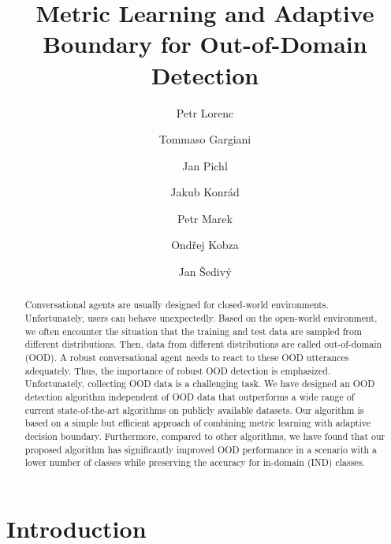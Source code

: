 \documentclass[runningheads]{llncs}
\begin{document}
\title{Metric Learning and Adaptive Boundary for Out-of-Domain Detection}
\author{Petr Lorenc \and
Tommaso Gargiani \and
Jan Pichl \and
Jakub Konrád \and
Petr Marek \and
Ondřej Kobza \and
Jan Šedivý
}
\maketitle              \begin{abstract}
Conversational agents are usually designed for closed-world environments. Unfortunately, users can behave unexpectedly. Based on the open-world environment, we often encounter the situation that the training and test data are sampled from different distributions. Then, data from different distributions are called out-of-domain (OOD). A robust conversational agent needs to react to these OOD utterances adequately. Thus, the importance of robust OOD detection is emphasized. Unfortunately, collecting OOD data is a challenging task. We have designed an OOD detection algorithm independent of OOD data that outperforms a wide range of current state-of-the-art algorithms on publicly available datasets. Our algorithm is based on a simple but efficient approach of combining metric learning with adaptive decision boundary. Furthermore, compared to other algorithms, we have found that our proposed algorithm has significantly improved OOD performance in a scenario with a lower number of classes while preserving the accuracy for in-domain (IND) classes.

\end{abstract}
\section{Introduction}
\end{document}

